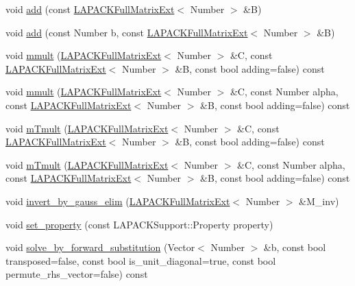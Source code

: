 \begin{DoxyCompactItemize}
\item 
void \hyperlink{classLAPACKFullMatrixExt_ae199890a11b5034d8ec2342c7de6c439}{add} (const \hyperlink{classLAPACKFullMatrixExt}{L\+A\+P\+A\+C\+K\+Full\+Matrix\+Ext}$<$ Number $>$ \&B)
\item 
void \hyperlink{classLAPACKFullMatrixExt_a7c46d0cb2e278577196b3d923e389efd}{add} (const Number b, const \hyperlink{classLAPACKFullMatrixExt}{L\+A\+P\+A\+C\+K\+Full\+Matrix\+Ext}$<$ Number $>$ \&B)
\item 
void \hyperlink{classLAPACKFullMatrixExt_a176ae32c5467facafd5dcc3252c07c20}{mmult} (\hyperlink{classLAPACKFullMatrixExt}{L\+A\+P\+A\+C\+K\+Full\+Matrix\+Ext}$<$ Number $>$ \&C, const \hyperlink{classLAPACKFullMatrixExt}{L\+A\+P\+A\+C\+K\+Full\+Matrix\+Ext}$<$ Number $>$ \&B, const bool adding=false) const
\item 
void \hyperlink{classLAPACKFullMatrixExt_ad38cc9eb7e424a932d9faff01cf08109}{mmult} (\hyperlink{classLAPACKFullMatrixExt}{L\+A\+P\+A\+C\+K\+Full\+Matrix\+Ext}$<$ Number $>$ \&C, const Number alpha, const \hyperlink{classLAPACKFullMatrixExt}{L\+A\+P\+A\+C\+K\+Full\+Matrix\+Ext}$<$ Number $>$ \&B, const bool adding=false) const
\item 
void \hyperlink{classLAPACKFullMatrixExt_a132200a53d62265a213059e2d93c8e82}{m\+Tmult} (\hyperlink{classLAPACKFullMatrixExt}{L\+A\+P\+A\+C\+K\+Full\+Matrix\+Ext}$<$ Number $>$ \&C, const \hyperlink{classLAPACKFullMatrixExt}{L\+A\+P\+A\+C\+K\+Full\+Matrix\+Ext}$<$ Number $>$ \&B, const bool adding=false) const
\item 
void \hyperlink{classLAPACKFullMatrixExt_a051726629042a908eafc057587a1b601}{m\+Tmult} (\hyperlink{classLAPACKFullMatrixExt}{L\+A\+P\+A\+C\+K\+Full\+Matrix\+Ext}$<$ Number $>$ \&C, const Number alpha, const \hyperlink{classLAPACKFullMatrixExt}{L\+A\+P\+A\+C\+K\+Full\+Matrix\+Ext}$<$ Number $>$ \&B, const bool adding=false) const
\item 
void \hyperlink{classLAPACKFullMatrixExt_a13bbc430a0f60d4158d1693a2d7a0235}{invert\+\_\+by\+\_\+gauss\+\_\+elim} (\hyperlink{classLAPACKFullMatrixExt}{L\+A\+P\+A\+C\+K\+Full\+Matrix\+Ext}$<$ Number $>$ \&M\+\_\+inv)
\item 
void \hyperlink{classLAPACKFullMatrixExt_a604d19d69393d88430293b48aad71a3b}{set\+\_\+property} (const L\+A\+P\+A\+C\+K\+Support\+::\+Property property)
\item 
void \hyperlink{classLAPACKFullMatrixExt_a72a5ead3fac2a7c37a9d5a14a9d6b286}{solve\+\_\+by\+\_\+forward\+\_\+substitution} (Vector$<$ Number $>$ \&b, const bool transposed=false, const bool is\+\_\+unit\+\_\+diagonal=true, const bool permute\+\_\+rhs\+\_\+vector=false) const

\end{DoxyCompactItemize}
